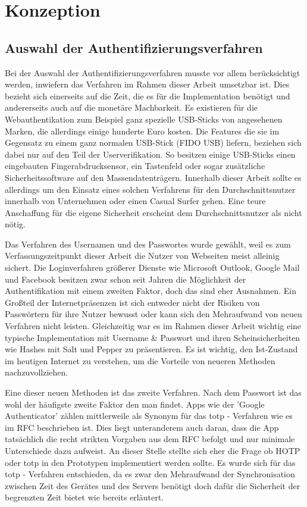 \chapter{Konzeption}
\section{Auswahl der Authentifizierungsverfahren}
Bei der Auswahl der Authentifizierungsverfahren musste vor allem berücksichtigt werden, inwiefern das Verfahren im Rahmen dieser Arbeit umsetzbar ist. Dies bezieht sich einerseits auf die Zeit, die es für die Implementation benötigt und andererseits auch auf die monetäre Machbarkeit. Es existieren für die Webauthentikation zum Beispiel ganz spezielle USB-Sticks von angesehenen Marken, die allerdings einige hunderte Euro kosten. Die Features die sie im Gegensatz zu einem ganz normalen USB-Stick (FIDO USB) liefern, beziehen sich dabei nur auf den Teil der Userverifikation. So besitzen einige USB-Sticks einen eingebauten Fingerabdrucksensor, ein Tastenfeld oder sogar zusätzliche Sicherheitssoftware auf den Massendatenträgern. Innerhalb dieser Arbeit sollte es allerdings um den Einsatz eines solchen Verfahrens für den Durchschnittsnutzer innerhalb von Unternehmen oder einen Casual Surfer gehen. Eine teure Anschaffung für die eigene Sicherheit erscheint dem Durchschnittsnutzer als nicht nötig.

Das Verfahren des Usernamen und des Passwortes wurde gewählt, weil es zum Verfassungszeitpunkt dieser Arbeit die Nutzer von Webseiten meist alleinig sichert. Die Loginverfahren größerer Dienste wie Microsoft Outlook, Google Mail und Facebook besitzen zwar schon seit Jahren die Möglichkeit der Authentifikation mit einem zweiten Faktor, doch das sind eher Ausnahmen. Ein Großteil der Internetpräsenzen ist sich entweder nicht der Risiken von Passwörtern für ihre Nutzer bewusst oder kann sich den Mehraufwand von neuen Verfahren nicht leisten. Gleichzeitig war es im Rahmen dieser Arbeit wichtig eine typische Implementation mit Username \& Passwort und ihren Scheinsicherheiten wie Hashes mit Salt und Pepper zu präsentieren. Es ist wichtig, den Ist-Zustand im heutigen Internet zu verstehen, um die Vorteile von neueren Methoden nachzuvollziehen.

Eine dieser neuen Methoden ist das zweite Verfahren. Nach dem Passwort ist das wohl der häufigste zweite Faktor den man findet. Apps wie der 'Google Authenticator' zählen mittlerweile als Synonym für das \ac{totp} - Verfahren wie es im RFC beschrieben ist. Dies liegt unteranderem auch daran, dass die App tatsächlich die recht strikten Vorgaben aus dem RFC befolgt und nur minimale Unterschiede dazu aufweist. An dieser Stelle stellte sich eher die Frage ob HOTP oder \ac{totp} in den Prototypen implementiert werden sollte. Es wurde sich für das \ac{totp} - Verfahren entschieden, da es zwar den Mehraufwand der Synchronisation zwischen Zeit des Gerätes und des Servers benötigt doch dafür die Sicherheit der begrenzten Zeit bietet wie bereits erläutert.

